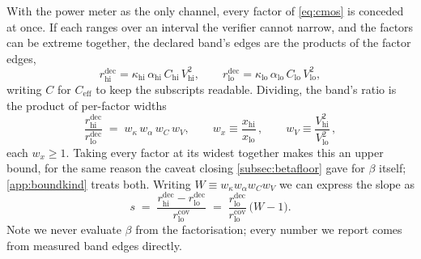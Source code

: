 \documentclass{article}
\theoremstyle{plain}
\theoremstyle{definition}
\theoremstyle{remark}
\begin{document}
With the power meter as the only channel, every factor of \cref{eq:cmos} is
conceded at once. If each ranges over an interval the verifier cannot narrow,
and the factors can be extreme together, the declared band's edges are the
products of the factor edges,
\begin{equation}
	r_{\mathrm{hi}}^{\mathrm{dec}} =
	\kappa_{\mathrm{hi}}\,\alpha_{\mathrm{hi}}\,C_{\mathrm{hi}}\,V_{\mathrm{hi}}^2,
	\qquad
	r_{\mathrm{lo}}^{\mathrm{dec}} =
	\kappa_{\mathrm{lo}}\,\alpha_{\mathrm{lo}}\,C_{\mathrm{lo}}\,V_{\mathrm{lo}}^2,
	\label{eq:edgefactor}
\end{equation}
writing $C$ for $C_{\mathrm{eff}}$ to keep the subscripts readable. Dividing,
the band's ratio is the product of per-factor widths
\begin{equation}
	\frac{r_{\mathrm{hi}}^{\mathrm{dec}}}{r_{\mathrm{lo}}^{\mathrm{dec}}}
	\;=\; w_\kappa\,w_\alpha\,w_C\,w_V,
	\qquad w_x \equiv \frac{x_{\mathrm{hi}}}{x_{\mathrm{lo}}}\,,
	\qquad w_V \equiv \frac{V_{\mathrm{hi}}^2}{V_{\mathrm{lo}}^2}\,,
	\label{eq:widthfactor}
\end{equation}
each $w_x \ge 1$. Taking every factor at its widest together makes this an upper bound, for
the same reason the caveat closing \cref{subsec:betafloor} gave for $\beta$
itself; \cref{app:boundkind} treats both. Writing
$W \equiv w_\kappa w_\alpha w_C w_V$ we can express the slope as 
\begin{equation}
	s \;=\;
	\frac{r_{\mathrm{hi}}^{\mathrm{dec}} - r_{\mathrm{lo}}^{\mathrm{dec}}}
	     {r_{\mathrm{lo}}^{\mathrm{cov}}}
	\;=\; \frac{r_{\mathrm{lo}}^{\mathrm{dec}}}{r_{\mathrm{lo}}^{\mathrm{cov}}}
	      \,\bigl(W - 1\bigr).
	\label{eq:slopebridge}
\end{equation}
Note  we never evaluate $\beta$ from the factorisation; every number we report comes
from measured band edges directly.
\end{document}
